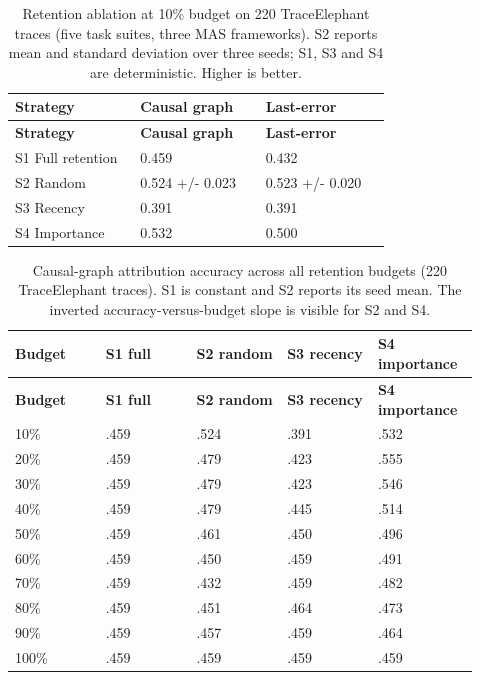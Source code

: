\documentclass[preprint,12pt]{elsarticle}
\begin{document}
\begin{center}
\begingroup
\setlength{\tabcolsep}{2pt}
\renewcommand{\arraystretch}{1.16}
\footnotesize
\begin{longtable}{|p{0.316\linewidth}|p{0.316\linewidth}|p{0.316\linewidth}|}
\caption{Retention ablation at 10\% budget on 220 TraceElephant traces (five task suites, three MAS frameworks). S2 reports mean and standard deviation over three seeds; S1, S3 and S4 are deterministic. Higher is better.}\label{tab:v5_9}\\
\hline
\textbf{Strategy} & \textbf{Causal graph} & \textbf{Last-error} \\ \hline
\endfirsthead
\textbf{Strategy} & \textbf{Causal graph} & \textbf{Last-error} \\ \hline
\endhead
S1 Full retention & 0.459 & 0.432 \\ \hline
S2 Random & 0.524 +/- 0.023 & 0.523 +/- 0.020 \\ \hline
S3 Recency & 0.391 & 0.391 \\ \hline
S4 Importance & 0.532 & 0.500 \\ \hline
\end{longtable}
\endgroup
\end{center}
\begin{center}
\begingroup
\setlength{\tabcolsep}{2pt}
\renewcommand{\arraystretch}{1.16}
\footnotesize
\begin{longtable}{|p{0.183\linewidth}|p{0.183\linewidth}|p{0.183\linewidth}|p{0.183\linewidth}|p{0.183\linewidth}|}
\caption{Causal-graph attribution accuracy across all retention budgets (220 TraceElephant traces). S1 is constant and S2 reports its seed mean. The inverted accuracy-versus-budget slope is visible for S2 and S4.}\label{tab:v5_10}\\
\hline
\textbf{Budget} & \textbf{S1 full} & \textbf{S2 random} & \textbf{S3 recency} & \textbf{S4 importance} \\ \hline
\endfirsthead
\textbf{Budget} & \textbf{S1 full} & \textbf{S2 random} & \textbf{S3 recency} & \textbf{S4 importance} \\ \hline
\endhead
10\% & .459 & .524 & .391 & .532 \\ \hline
20\% & .459 & .479 & .423 & .555 \\ \hline
30\% & .459 & .479 & .423 & .546 \\ \hline
40\% & .459 & .479 & .445 & .514 \\ \hline
50\% & .459 & .461 & .450 & .496 \\ \hline
60\% & .459 & .450 & .459 & .491 \\ \hline
70\% & .459 & .432 & .459 & .482 \\ \hline
80\% & .459 & .451 & .464 & .473 \\ \hline
90\% & .459 & .457 & .459 & .464 \\ \hline
100\% & .459 & .459 & .459 & .459 \\ \hline
\end{longtable}
\endgroup
\end{center}
\end{document}
